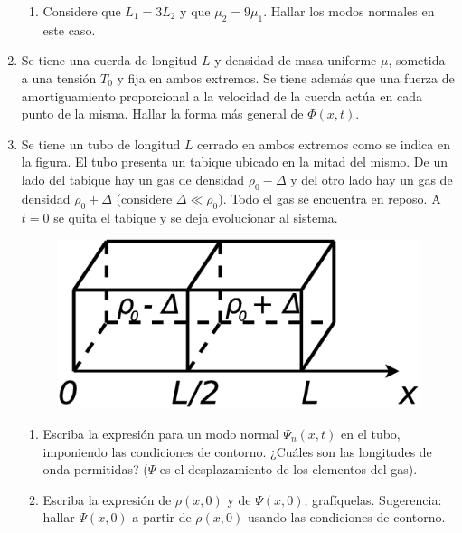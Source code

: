 \documentclass[11pt,spanish]{article}
\begin{document}
\begin{enumerate}
\begin{enumerate}
        \item Considere que $L_{1}=3L_{2}$ y que $\mu_{2}=9\mu_{1}$. Hallar los
        modos normales en este caso.
    \end{enumerate}


    \item Se tiene una cuerda de longitud $L$ y densidad de masa uniforme $\mu$,
    sometida a una tensión $T_{0}$ y fija en ambos extremos. Se tiene además
    que una fuerza de amortiguamiento proporcional a la velocidad de la cuerda
    actúa en cada punto de la misma. Hallar la forma más general de $\Phi(x,t)$.


    \item Se tiene un tubo de longitud $L$ cerrado en ambos extremos como se
    indica en la figura. El tubo presenta un tabique ubicado en la mitad del
    mismo. De un lado del tabique hay un gas de densidad $\rho_{0}-\Delta$ y del
    otro lado hay un gas de densidad $\rho_{0}+\Delta$ (considere $\Delta\ll\rho_{0}$).
    Todo el gas se encuentra en reposo. A $t=0$ se quita el tabique y se deja
    evolucionar al sistema.

    \begin{figure}[H]
        \centering{}\includegraphics[clip,scale=0.25]{figs/ej1-30}
    \end{figure}

    \begin{enumerate}
        \item Escriba la expresión para un modo normal $\Psi_{n}(x,t)$ en el
        tubo, imponiendo las condiciones de contorno. ¿Cuáles son las longitudes
        de onda permitidas? ($\Psi$ es el desplazamiento de los elementos del
        gas). 

        \item Escriba la expresión de $\rho(x,0)$ y de $\Psi(x,0)$; grafíquelas.
        Sugerencia: hallar $\Psi(x,0)$ a partir de $\rho(x,0)$ usando las
        condiciones de contorno.


\end{enumerate}
\end{enumerate}
\end{document}

